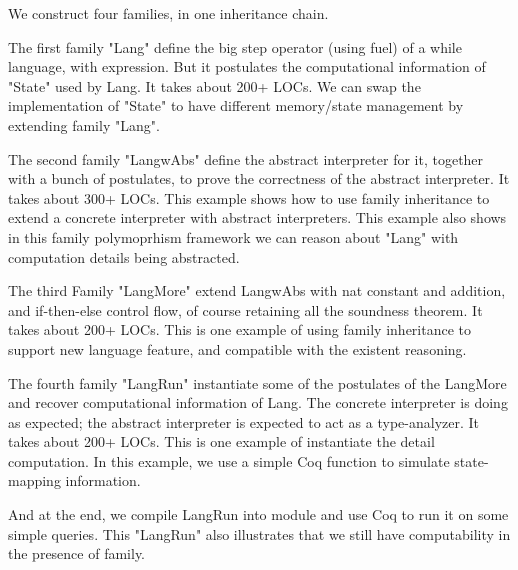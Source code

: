 We construct four families, in one inheritance chain.


The first family "Lang" define the big step operator (using fuel) of a
while language, with expression. But it postulates the computational
information of "State" used by Lang. It takes about 200+ LOCs. We
can
swap the implementation of "State" to have different memory/state
management by extending family "Lang".

The second family "LangwAbs" define the abstract interpreter for it,
together with a bunch of postulates, to prove the correctness of the
abstract interpreter. It takes about 300+ LOCs. This example shows how
to use family inheritance to extend a concrete interpreter with abstract
interpreters. This example also shows in this family polymoprhism
framework we can reason about "Lang" with computation details being
abstracted. 

The third Family "LangMore" extend LangwAbs with nat constant and
addition, and if-then-else control flow, of course retaining all the
soundness theorem. It takes about 200+ LOCs. This is one example of
using family inheritance to support new language feature, and compatible
with the existent reasoning. 

The fourth family "LangRun" instantiate some of the postulates of the
LangMore and recover computational information of Lang. The concrete
interpreter is doing as expected; the abstract interpreter is expected
to act as a type-analyzer. It takes about 200+ LOCs. This is one example
of instantiate the detail computation. In this example, we use a simple
Coq function to simulate state-mapping information. 

And at the end, we compile LangRun into module and use Coq to run it on
some simple queries. This "LangRun" also illustrates that we still have
computability in the presence of family.